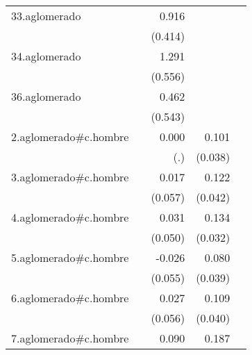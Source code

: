 {\begin{longtable}{l*{4}{D{.}{.}{-1}}}
\addlinespace
33.aglomerado&                     &       0.916\sym{*}  &                     &                     \\
            &                     &     (0.414)         &                     &                     \\
\addlinespace
34.aglomerado&                     &       1.291\sym{*}  &                     &                     \\
            &                     &     (0.556)         &                     &                     \\
\addlinespace
36.aglomerado&                     &       0.462         &                     &                     \\
            &                     &     (0.543)         &                     &                     \\
\addlinespace
2.aglomerado#c.hombre&                     &       0.000         &       0.101\sym{**} &                     \\
            &                     &         (.)         &     (0.038)         &                     \\
\addlinespace
3.aglomerado#c.hombre&                     &       0.017         &       0.122\sym{**} &                     \\
            &                     &     (0.057)         &     (0.042)         &                     \\
\addlinespace
4.aglomerado#c.hombre&                     &       0.031         &       0.134\sym{***}&                     \\
            &                     &     (0.050)         &     (0.032)         &                     \\
\addlinespace
5.aglomerado#c.hombre&                     &      -0.026         &       0.080\sym{*}  &                     \\
            &                     &     (0.055)         &     (0.039)         &                     \\
\addlinespace
6.aglomerado#c.hombre&                     &       0.027         &       0.109\sym{**} &                     \\
            &                     &     (0.056)         &     (0.040)         &                     \\
\addlinespace
7.aglomerado#c.hombre&                     &       0.090         &       0.187\sym{***}&                     \\

\end{longtable}}
